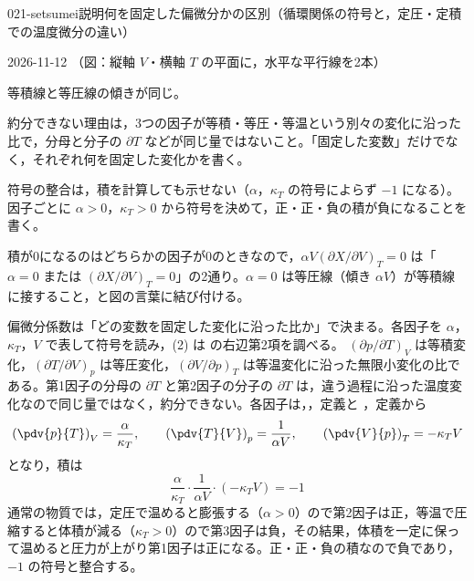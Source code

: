\documentclass[uplatex,dvipdfmx,a4paper,11pt]{jsarticle}
\begin{document}
\begin{mondai}{021-setsumei}{説明}{何を固定した偏微分かの区別（循環関係の符号と，定圧・定積での温度微分の違い）}
\begin{kotaeutsushi}{2026-11-12}
（図：縦軸 $V$・横軸 $T$ の平面に，水平な平行線を2本）

等積線と等圧線の傾きが同じ。
\end{kotaeutsushi}
\begin{kizuki}
\item 約分できない理由は，3つの因子が等積・等圧・等温という別々の変化に沿った比で，分母と分子の $\partial T$ などが同じ量ではないこと。「固定した変数」だけでなく，それぞれ何を固定した変化かを書く。
\item 符号の整合は，積を計算しても示せない（$\alpha$，$\kappa_{T}$ の符号によらず $-1$ になる）。因子ごとに $\alpha>0$，$\kappa_{T}>0$ から符号を決めて，正・正・負の積が負になることを書く。
\item 積が0になるのはどちらかの因子が0のときなので，$\alpha V(\partial X/\partial V)_{T}=0$ は「$\alpha=0$ または $(\partial X/\partial V)_{T}=0$」の2通り。$\alpha=0$ は等圧線（傾き $\alpha V$）が等積線に接すること，と図の言葉に結び付ける。
\end{kizuki}
\begin{tadashii}
\houshin 偏微分係数は「どの変数を固定した変化に沿った比か」で決まる。各因子を $\alpha$，$\kappa_{T}$，$V$ で表して符号を読み，(2) は  の右辺第2項を調べる。
\keisan {} $(\partial p/\partial T)_{V}$ は等積変化，$(\partial T/\partial V)_{p}$ は等圧変化，$(\partial V/\partial p)_{T}$ は等温変化に沿った無限小変化の比である。第1因子の分母の $\partial T$ と第2因子の分子の $\partial T$ は，違う過程に沿った温度変化なので同じ量ではなく，約分できない。各因子は，，定義と ，定義から
\[ \left(\pdv{p}{T}\right)_{V} = \frac{\alpha}{\kappa_{T}}, \qquad \left(\pdv{T}{V}\right)_{p} = \frac{1}{\alpha V}, \qquad \left(\pdv{V}{p}\right)_{T} = -\kappa_{T}V \]
となり，積は
\[ \frac{\alpha}{\kappa_{T}}\cdot\frac{1}{\alpha V}\cdot(-\kappa_{T}V) = -1 \]
通常の物質では，定圧で温めると膨張する（$\alpha > 0$）ので第2因子は正，等温で圧縮すると体積が減る（$\kappa_{T} > 0$）ので第3因子は負，その結果，体積を一定に保って温めると圧力が上がり第1因子は正になる。正・正・負の積なので負であり，$-1$ の符号と整合する。

\end{tadashii}
\end{mondai}
\end{document}
